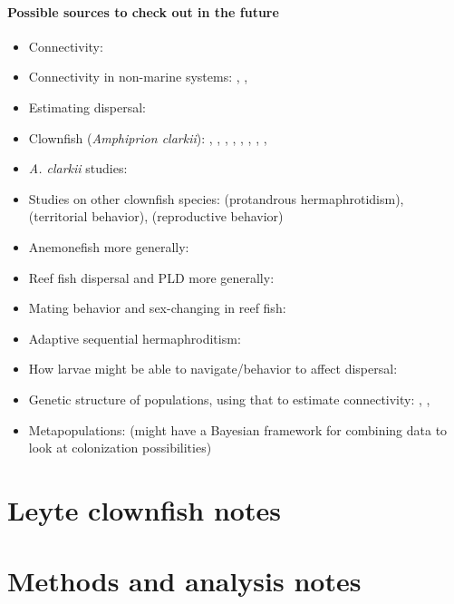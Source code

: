 \documentclass[12pt, oneside]{article}   	%
\begin{document}
\paragraph*{Possible sources to check out in the future}
\begin{itemize}
\item Connectivity: 
\item Connectivity in non-marine systems: \cite{nathan2000spatial}, \cite{jordano2007differential}, \cite{nathan2008mechanisms}
\item Estimating dispersal: \cite{taylor2000evaluating}
\item Clownfish (\textit{Amphiprion clarkii}): \cite{srinivasan1999experimental}, \cite{bell1976notes}, \cite{moyer1980influence}, \cite{fricke1983social}, \cite{fricke1977monogamy}, \cite{moyer1976geographical}, \cite{moyer1976reproductive}, \cite{ochi1985temporal}, \cite{yanagisawa1986step} 
\item \textit{A. clarkii} studies:
\item Studies on other clownfish species: \cite{moyer1978protandrous} (protandrous hermaphrotidism), \cite{moyer1973territorial} (territorial behavior), \cite{ross1978reproductive} (reproductive behavior)
\item Anemonefish more generally: \cite{fautin1986anemonefishes}
\item Reef fish dispersal and PLD more generally: \cite{brothers1985pelagic}
\item Mating behavior and sex-changing in reef fish: \cite{warner1984mating}
\item Adaptive sequential hermaphroditism: \cite{warner1975adaptive}
\item How larvae might be able to navigate/behavior to affect dispersal: \cite{leis2011nemo}
\item Genetic structure of populations, using that to estimate connectivity: \cite{selkoe2014emergent}, \cite{selkoe2010taking}, \cite{selkoe2006current}
\item Metapopulations: \cite{gaggiotti2004combining} (might have a Bayesian framework for combining data to look at colonization possibilities)
\end{itemize}

\section*{Leyte clownfish notes}

\section*{Methods and analysis notes}
\end{document}

